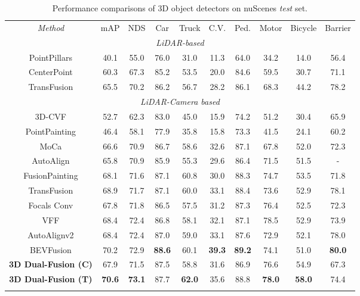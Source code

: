 \documentclass[lettersize,journal]{IEEEtran}
\begin{document}
\begin{table*}[t]
\renewcommand{\arraystretch}{1.0}
\centering
\caption{Performance comparisons of 3D object detectors on nuScenes \textit{test} set. }
\begin{tabular}{cccccccccc}
\cline{1-10}
\textit{Method}        & mAP  & NDS     & Car    & Truck   & C.V.  & Ped.  & Motor & Bicycle  & Barrier \\
\cline{1-10}
\multicolumn{10}{c}{\textit{LiDAR-based}}                                                                \\
\cline{1-10}
PointPillars\cite{PointPillars}  & 40.1 & 55.0  & 76.0  & 31.0   & 11.3  & 64.0 & 34.2 & 14.0    & 56.4   \\
CenterPoint\cite{centerpoint}   & 60.3 & 67.3  & 85.2  & 53.5   & 20.0  & 84.6 & 59.5 & 30.7    & 71.1   \\
TransFusion\cite{transfusion}   & 65.5 & 70.2  & 86.2  & 56.7   & 28.2  & 86.1 & 68.3 & 44.2    & 78.2   \\
\cline{1-10}
\multicolumn{10}{c}{\textit{LiDAR-Camera based}}                                                               
\\
\cline{1-10}
3D-CVF\cite{3d-cvf}        & 52.7 & 62.3  & 83.0  & 45.0   &  15.9    & 74.2 & 51.2 & 30.4       & 65.9   \\
PointPainting\cite{vora2020pointpainting} & 46.4 & 58.1  & 77.9  & 35.8   & 15.8  & 73.3 & 41.5 & 24.1   & 60.2   \\
MoCa\cite{moca}          & 66.6 & 70.9  & 86.7 & 58.6    & 32.6  & 87.1 & 67.8 & 52.0   &  72.3   \\
AutoAlign\cite{autoalign} & 65.8 & 70.9  & 85.9 & 55.3 & 29.6  & 86.4  & 71.5 & 51.5   & - \\
FusionPainting\cite{fusionpainting} & 68.1 & 71.6  & 87.1 & 60.8    & 30.0  & 88.3 & 74.7 & 53.5   & 71.8   \\
TransFusion\cite{transfusion} & 68.9 & 71.7  & 87.1 & 60.0  & 33.1   & 88.4 & 73.6 & 52.9   & 78.1 \\
Focals Conv\cite{focalsconv}    & 67.8 & 71.8 & 86.5 & 57.5 & 31.2  & 87.3 & 76.4 & 52.5  & 72.3   \\
VFF\cite{vff} & 68.4 & 72.4 & 86.8 & 58.1 & 32.1 & 87.1 & 78.5 & 52.9 & 73.9 \\
AutoAlignv2\cite{autoalignv2} & 68.4 & 72.4  & 87.0 & 59.0 & 33.1  & 87.6  & 72.9 & 52.1   & 78.0 \\
BEVFusion\cite{bevfusion} & 70.2 & 72.9  & \textbf{88.6} & 60.1 & \textbf{39.3}  & \textbf{89.2}  & 74.1 & 51.0   & \textbf{80.0} \\


\cline{1-10}
\textbf{3D Dual-Fusion (C)}      & 67.9 & 71.5  & 87.5 & 58.8  & 31.6  & 86.9 & 76.6 & 54.9  & 67.3   \\
\textbf{3D Dual-Fusion (T)}      & \textbf{70.6} & \textbf{73.1}  & 87.7 & \textbf{62.0} & 35.6 & 88.8 & \textbf{78.0} & \textbf{58.0}  & 74.4
  \\
\cline{1-10}
\label{table:nus_test}
\end{tabular}
\end{table*}
 
\end{document}

